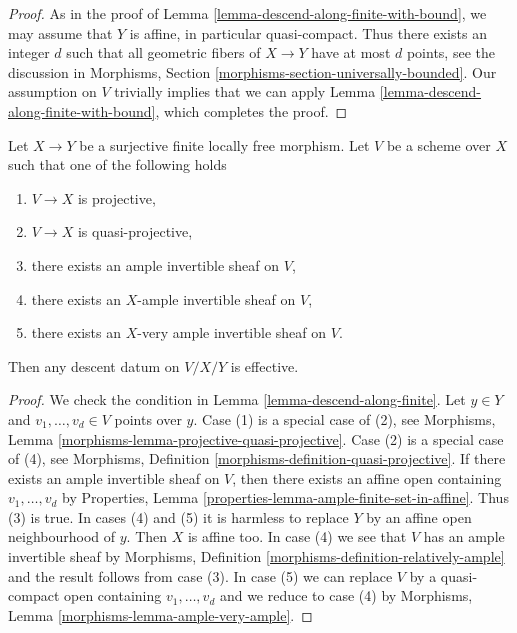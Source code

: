 \begin{proof}
As in the proof of Lemma \ref{lemma-descend-along-finite-with-bound}, we
may assume that $Y$ is affine, in particular quasi-compact. Thus there
exists an integer $d$ such that all geometric fibers of $X \to Y$
have at most $d$ points, see the discussion in Morphisms, Section
\ref{morphisms-section-universally-bounded}.
Our assumption on $V$ trivially implies that we can apply
Lemma \ref{lemma-descend-along-finite-with-bound}, which completes the proof.
\end{proof}

\begin{lemma}
\label{lemma-descend-along-finite-quasi-projective}
Let $X \to Y$ be a surjective finite locally free morphism.
Let $V$ be a scheme over $X$ such that one of the following holds
\begin{enumerate}
\item $V \to X$ is projective,
\item $V \to X$ is quasi-projective,
\item there exists an ample invertible sheaf on $V$,
\item there exists an $X$-ample invertible sheaf on $V$,
\item there exists an $X$-very ample invertible sheaf on $V$.
\end{enumerate}
Then any descent datum on $V/X/Y$ is effective.
\end{lemma}

\begin{proof}
We check the condition in Lemma \ref{lemma-descend-along-finite}.
Let $y \in Y$ and $v_1, \ldots, v_d \in V$ points over $y$.
Case (1) is a special case of (2), see
Morphisms, Lemma \ref{morphisms-lemma-projective-quasi-projective}.
Case (2) is a special case of (4), see
Morphisms, Definition \ref{morphisms-definition-quasi-projective}.
If there exists an ample invertible sheaf on $V$, then
there exists an affine open containing $v_1, \ldots, v_d$ by
Properties, Lemma \ref{properties-lemma-ample-finite-set-in-affine}.
Thus (3) is true.
In cases (4) and (5) it is harmless to replace $Y$ by an
affine open neighbourhood of $y$.
Then $X$ is affine too.
In case (4) we see that $V$ has an ample invertible sheaf
by Morphisms, Definition \ref{morphisms-definition-relatively-ample}
and the result follows from case (3).
In case (5) we can replace $V$ by a quasi-compact open containing
$v_1, \ldots, v_d$ and we reduce to case (4) by
Morphisms, Lemma \ref{morphisms-lemma-ample-very-ample}.
\end{proof}

